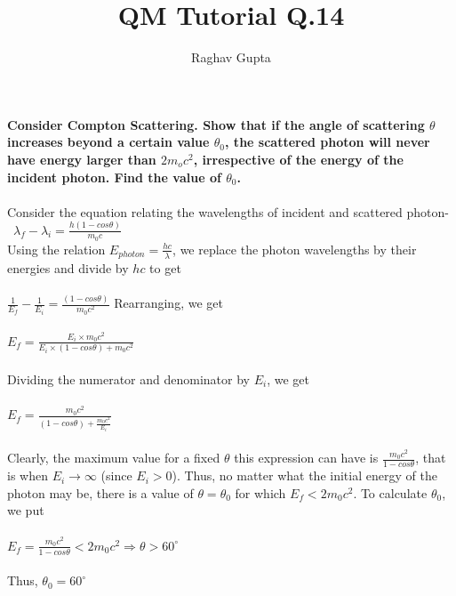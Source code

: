 \documentclass{article}
\begin{document}
\title{QM Tutorial Q.14}
\author{Raghav Gupta}
\maketitle
\textbf{Consider Compton Scattering. Show that if the angle of scattering \(\theta\) increases
beyond a certain value \(\theta_0\), the scattered photon will never have energy larger than
\(2m_oc^2\), irrespective of the energy of the incident photon. Find the value of \(\theta_0\).}\\\\
Consider the equation relating the wavelengths of incident and scattered photon-\\\ \(\lambda_f - \lambda_i = \frac{h(1-cos\theta)}{m_0c}\)\\Using the relation \(E_{photon} = \frac{hc}{\lambda}\), we replace the photon wavelengths by their energies and divide by \(hc\) to get\\\\
\(\frac{1}{E_f} - \frac{1}{E_i} = \frac{(1-cos\theta)}{m_0c^2}\)
Rearranging, we get\\\\
\(E_f = \frac{E_i\times m_0c^2}{E_i\times (1-cos\theta) + m_0c^2}\)\\\\Dividing the numerator and denominator by \(E_i\), we get\\\\\(E_f = \frac{m_0c^2}{(1-cos\theta) + \frac{m_0c^2}{E_i}}\)\\\\Clearly, the maximum value for a fixed \(\theta\) this expression can have is \(\frac{m_0c^2}{1-cos\theta}\), that is when \(E_i \rightarrow \infty\) (since \(E_i > 0\)). Thus, no matter what the initial energy of the photon may be, there is a value of \(\theta = \theta_0\) for which \(E_f < 2m_0c^2\). To calculate \(\theta_0\), we put\\\\\(E_f = \frac{m_0c^2}{1-cos\theta} < 2m_0c^2 \Rightarrow \theta > 60^{\circ}\)\\\\Thus, \underline{\(\theta_0 = 60^{\circ}\)}
\end{document}
